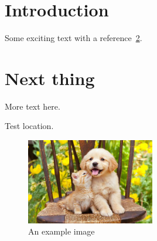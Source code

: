 \documentclass{article}
\begin{document}
 \section{Introduction}
 Some exciting text with a reference~\ref{sec:next}.
 \section{Next thing}
 \label{sec:next}
 More text here.



\lipsum[1-4] %
 Test location.
 \begin{figure}[b]
 \centering
 \includegraphics[width=0.5\textwidth]{pic.jpg}
 \caption{An example image}
 \end{figure}
 \lipsum[6-10] %
 
\end{document}
